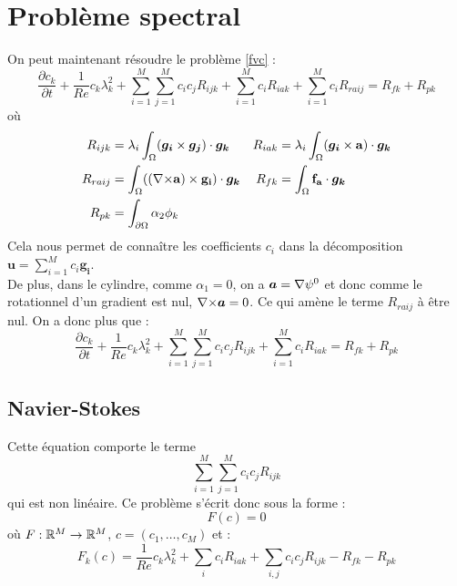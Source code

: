 \chapter{Problème spectral}
On peut maintenant résoudre le problème \ref{fvc} :
\[ \frac{\partial c_k}{\partial t} + \frac{1}{Re}c_k\lambda_k^2 + \sum_{i=1}^M\sum_{j=1}^Mc_ic_jR_{ijk} + \sum_{i=1}^Mc_iR_{iak} + \sum_{i=1}^Mc_iR_{raij} = R_{fk}+R_{pk} \]
où
\begin{align*}
R_{ijk} &= \lambda_i\int_\Omega(\bm{g_i}\times \bm{g_j})\cdot\bm{g_k} & R_{iak} &= \lambda_i\int_\Omega(\bm{g_i}\times \mathbf{a})\cdot\bm{g_k}\\
R_{raij} &= \int_\Omega(({\nabla\times}\mathbf{a})\times \mathbf{g_i})\cdot\bm{g_k} & R_{fk} &= \int_\Omega\mathbf{f_a}\cdot\bm{g_k}\\
R_{pk} &= \int_{\partial\Omega} \alpha_2\phi_k
\end{align*}
Cela nous permet de connaître les coefficients $c_i$ dans la décomposition $\bm{u}=\sum_{i=1}^M c_i\bm{g_i}$.\\


De plus, dans le cylindre, comme $\alpha_1=0$, on a $\bm{a}={\nabla}\psi^0$ et donc comme le rotationnel d'un gradient est nul, ${\nabla\times} \bm{a} = 0$. Ce qui amène le terme $R_{raij}$ à être nul. On a donc plus que :
\[ \frac{\partial c_k}{\partial t} + \frac{1}{Re}c_k\lambda_k^2 + \sum_{i=1}^M\sum_{j=1}^Mc_ic_jR_{ijk} + \sum_{i=1}^Mc_iR_{iak} = R_{fk}+R_{pk} \]

\section{Navier-Stokes}
\label{PSNewton}
Cette équation comporte le terme
\[ \sum_{i=1}^M\sum_{j=1}^M c_i c_jR_{ijk} \]
qui est non linéaire. Ce problème s'écrit donc sous la forme :
\[ F(c) = 0 \]
où $F:{\mathbb{R}}^M\rightarrow{\mathbb{R}}^M$, $c=(c_1,\ldots, c_M)$ et :
\begin{equation}\label{psf}
 F_k(c) = \frac{1}{Re} c_k\lambda_k^2 + \sum_i c_i R_{iak} + \sum_{i,j} c_i c_j R_{ijk} - R_{fk} - R_{pk}
\end{equation}

